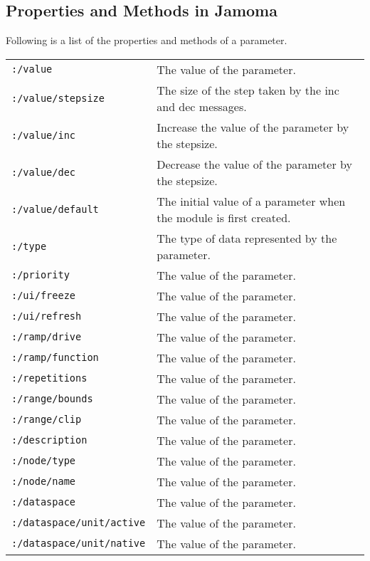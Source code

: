 \documentclass{article}
\begin{document}
\subsection{Properties and Methods in Jamoma}
Following is a list of the properties and methods of a parameter.
\begin{center} 
{\footnotesize
\begin{tabular}{ll}
	\texttt{:/value} & The value of the parameter. \\
	\texttt{:/value/stepsize} & The size of the step taken by the inc and dec messages. \\
	\texttt{:/value/inc} & Increase the value of the parameter by the stepsize. \\
	\texttt{:/value/dec} & Decrease the value of the parameter by the stepsize. \\
	\texttt{:/value/default} & The initial value of a parameter when the module is first created. \\
	\texttt{:/type} & The type of data represented by the parameter. \\
	\texttt{:/priority} & The value of the parameter. \\
	\texttt{:/ui/freeze} & The value of the parameter. \\
	\texttt{:/ui/refresh} & The value of the parameter. \\
	\texttt{:/ramp/drive} & The value of the parameter. \\
	\texttt{:/ramp/function} & The value of the parameter. \\
	\texttt{:/repetitions} & The value of the parameter. \\
	\texttt{:/range/bounds} & The value of the parameter. \\
	\texttt{:/range/clip} & The value of the parameter. \\
	\texttt{:/description} & The value of the parameter. \\
	\texttt{:/node/type} & The value of the parameter. \\
	\texttt{:/node/name} & The value of the parameter. \\
	\texttt{:/dataspace} & The value of the parameter. \\
	\texttt{:/dataspace/unit/active} & The value of the parameter. \\
	\texttt{:/dataspace/unit/native} & The value of the parameter. \\
\end{tabular} } 
\end{center}  
\end{document}
